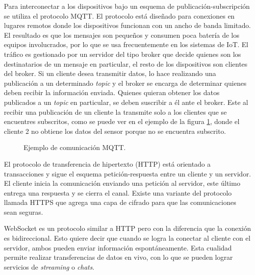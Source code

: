 Para interconectar a los dispositivos bajo un esquema de publicación-subscripción se utiliza el protocolo MQTT.
El protocolo está diseñado para conexiones en lugares remotos donde los dispositivos funcionan con un ancho de banda limitado.
El resultado es que los mensajes son pequeños y consumen poca batería de los equipos involucrados, por lo que se usa frecuentemente en los sistemas de IoT.
El tráfico es gestionado por un servidor del tipo broker que decide quienes son los destinatarios de un mensaje en particular, el resto de los dispositivos son clientes del broker.
Si un cliente desea transmitir datos, lo hace realizando una publicación a un determinado \emph{topic} y el broker se encarga de determinar quienes deben recibir la información enviada.
Quienes quieran obtener los datos publicados a un \emph{topic} en particular, se deben suscribir a él ante el broker.
Este al recibir una publicación de un cliente la transmite solo a los clientes que se encuentres subscritos, como se puede ver en el ejemplo de la figura \ref{fig:ch1MqttEjemplo}, donde el cliente 2 no obtiene los datos del sensor porque no se encuentra subscrito.

\begin{figure}[h]
	\centering
	\caption{Ejemplo de comunicación MQTT.}
	\label{fig:ch1MqttEjemplo}
\end{figure}

El protocolo de transferencia de hipertexto (HTTP) está orientado a transacciones y sigue el esquema petición-respuesta entre un cliente y un servidor.
El cliente inicia la comunicación enviando una petición al servidor, este último entrega una respuesta y se cierra el canal.
Existe una variante del protocolo llamada HTTPS que agrega una capa de cifrado para que las comunicaciones sean seguras.

WebSocket es un protocolo similar a HTTP pero con la diferencia que la conexión es bidireccional.
Esto quiere decir que cuando se logra la conectar al cliente con el servidor, ambos pueden enviar información espontáneamente. Esta cualidad permite realizar transferencias de datos en vivo, con lo que se pueden lograr servicios de \emph{streaming} o \emph{chats}.

